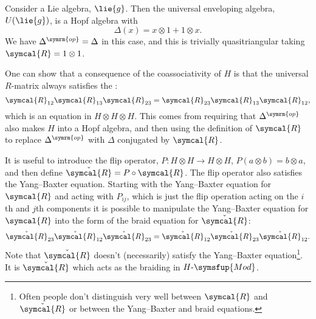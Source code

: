 \documentclass[fleqn]{NotesClass}
\makeatletter
\newcommand{\op}{\symrm{op}}
\newcommand{\c@egory}[1]{\symsfup{#1}}
\newcommand{\AMod}[1][A]{#1\text{-}\c@egory{Mod}}
\newcommand{\universalRmatrix}{\symcal{R}}
\makeatother
\begin{document}
    \begin{exm}{}{}
        Consider a Lie algebra, \(\lie{g}\).
        Then the universal enveloping algebra, \(U(\lie{g})\), is a Hopf algebra with
        \begin{equation}
            \Delta(x) = x \otimes 1 + 1 \otimes x.
        \end{equation}
        We have \(\Delta^{\op} = \Delta\) in this case, and this is trivially quasitriangular taking \(\universalRmatrix = 1 \otimes 1\).
    \end{exm}
    
    One can show that a consequence of the coassociativity of \(H\) is that the universal \(R\)-matrix always satisfies the :
    \begin{equation}
        \universalRmatrix_{12}\universalRmatrix_{13}\universalRmatrix_{23} = \universalRmatrix_{23}\universalRmatrix_{13}\universalRmatrix_{12},
    \end{equation}
    which is an equation in \(H \otimes H \otimes H\).
    This comes from requiring that \(\Delta^{\op}\) also makes \(H\) into a Hopf algebra, and then using the definition of \(\universalRmatrix\) to replace \(\Delta^{\op}\) with \(\Delta\) conjugated by \(\universalRmatrix\).
    
    It is useful to introduce the flip operator, \(P \colon H \otimes H \to H \otimes H\), \(P(a \otimes b) = b \otimes a\), and then define \(\check{\universalRmatrix} = P \circ \universalRmatrix\).
    The flip operator also satisfies the Yang--Baxter equation.
    Starting with the Yang--Baxter equation for \(\universalRmatrix\) and acting with \(P_{ij}\), which is just the flip operation acting on the \(i\)th and \(j\)th components it is possible to manipulate the Yang--Baxter equation for \(\universalRmatrix\) into the form of the braid equation for \(\check{\universalRmatrix}\):
    \begin{equation}
        \check{\universalRmatrix}_{23} \check{\universalRmatrix}_{12} \check{\universalRmatrix}_{23} = \check{\universalRmatrix}_{12} \check{\universalRmatrix}_{23} \check{\universalRmatrix}_{12}.
    \end{equation}
    Note that \(\check{\universalRmatrix}\) doesn't (necessarily) satisfy the Yang--Baxter equation\footnote{Often people don't distinguish very well between \(\universalRmatrix\) and \(\check{\universalRmatrix}\) or between the Yang--Baxter and braid equations.}.
    It is \(\check{\universalRmatrix}\) which acts as the braiding in \(\AMod[H]\).
    
\end{document}
